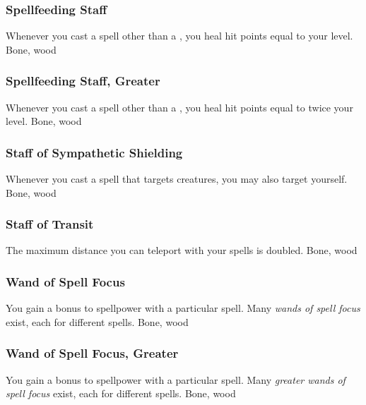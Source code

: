 \lowercase{\hypertarget{item:Spellfeeding Staff}{}}\label{item:Spellfeeding Staff}
\hypertarget{item:Spellfeeding Staff}{\subsubsection{Spellfeeding Staff\hfill{}}}
Whenever you cast a spell other than a , you heal hit points equal to your level.
 
 Bone, wood
\lowercase{\hypertarget{item:Spellfeeding Staff, Greater}{}}\label{item:Spellfeeding Staff, Greater}
\hypertarget{item:Spellfeeding Staff, Greater}{\subsubsection{Spellfeeding Staff, Greater\hfill{}}}
Whenever you cast a spell other than a , you heal hit points equal to twice your level.
 
 Bone, wood
\lowercase{\hypertarget{item:Staff of Sympathetic Shielding}{}}\label{item:Staff of Sympathetic Shielding}
\hypertarget{item:Staff of Sympathetic Shielding}{\subsubsection{Staff of Sympathetic Shielding\hfill{}}}
Whenever you cast a  spell that targets creatures, you may also target yourself.
 
 Bone, wood
\lowercase{\hypertarget{item:Staff of Transit}{}}\label{item:Staff of Transit}
\hypertarget{item:Staff of Transit}{\subsubsection{Staff of Transit\hfill{}}}
The maximum distance you can teleport with your  spells is doubled.
 
 Bone, wood
\lowercase{\hypertarget{item:Wand of Spell Focus}{}}\label{item:Wand of Spell Focus}
\hypertarget{item:Wand of Spell Focus}{\subsubsection{Wand of Spell Focus\hfill{}}}
You gain a  bonus to spellpower with a particular spell.
Many \textit{wands of spell focus} exist, each for different spells.
 
 Bone, wood
\lowercase{\hypertarget{item:Wand of Spell Focus, Greater}{}}\label{item:Wand of Spell Focus, Greater}
\hypertarget{item:Wand of Spell Focus, Greater}{\subsubsection{Wand of Spell Focus, Greater\hfill{}}}
You gain a  bonus to spellpower with a particular spell.
Many \textit{greater wands of spell focus} exist, each for different spells.
 
 Bone, wood
